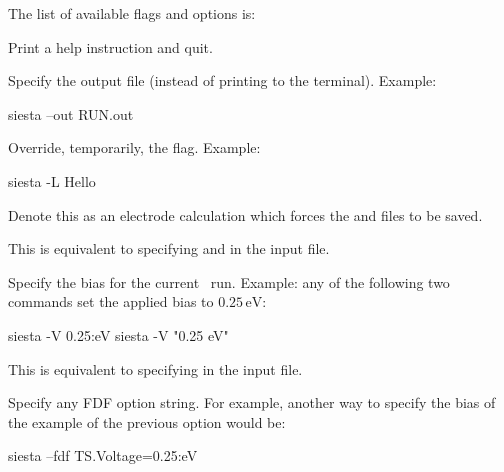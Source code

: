 The list of available flags and options is:
\begin{fdfoptions}

  \option[-help|-h]%
  Print a help instruction and quit.

  \option[-out|-o]%
  Specify the output file (instead of printing to the terminal).
  Example:

  \begin{shellexample}
  siesta --out RUN.out
  \end{shellexample}

  \option[-L]%
  Override, temporarily, the  flag.
  Example:

  \begin{shellexample}
  siesta -L Hello
  \end{shellexample}

  Denote this as an electrode calculation which forces the
   and  files to be saved.

  \note This is equivalent to specifying  and
   in the input file.

  \option[-V]%
  Specify the bias for the current \tsiesta\ run.
  Example: any of the following two commands set the applied bias to
  $0.25\,\mathrm{eV}$:

  \begin{shellexample}
  siesta -V 0.25:eV
  siesta -V "0.25 eV"
  \end{shellexample}

  \note This is equivalent to specifying  in the input
  file.

  \option[-fdf]%
  Specify any FDF option string.  For example, another way to specify the bias
  of the example of the previous option would be:

  \begin{shellexample}
  siesta --fdf TS.Voltage=0.25:eV
  \end{shellexample}

\end{fdfoptions}


